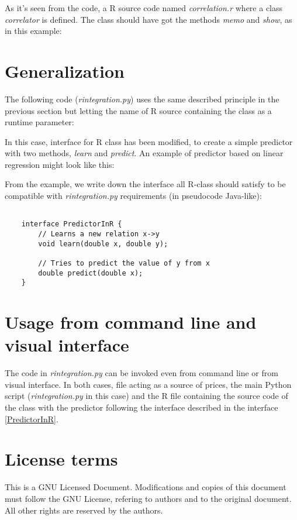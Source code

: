 \documentclass[11pt,a4paper]{article}
\begin{document}
\lstset{language=Python,frame=single,tabsize=2,basicstyle=\tiny}


As it's seen from the code, a R source code named \emph{correlation.r}
where a class \emph{correlator} is defined. The class should have got the
methods \emph{memo} and \emph{show}, as in this example:

\lstset{language=R,frame=single,tabsize=2,basicstyle=\tiny}




\section{Generalization}

The following code (\emph{rintegration.py}) uses the same described principle 
in the previous section but letting the name of R source containing the 
class as a runtime parameter:

\lstset{language=Python,frame=single,tabsize=2,basicstyle=\tiny}


In this case, interface for R class has been modified, to create a simple
predictor with two methods, \emph{learn} and \emph{predict}. An example of
predictor based on linear regression might look like this:

From the example, we write down the interface all R-class should satisfy
to be compatible with \emph{rintegration.py} requirements (in pseudocode 
Java-like):

\lstset{language=Java,frame=single,tabsize=4,basicstyle=\tiny}
\begin{lstlisting}

    interface PredictorInR {
        // Learns a new relation x->y
        void learn(double x, double y);

        // Tries to predict the value of y from x
        double predict(double x);
    }

\end{lstlisting}
\label{PredictorInR}



\section{Usage from command line and visual interface}

The code in \emph{rintegration.py} can be invoked even from command line or
from visual interface. In both cases, file acting as a source of prices,
the main Python script (\emph{rintegration.py} in this case) and the R file
containing the source code of the class with the predictor following the 
interface described in the interface \ref{PredictorInR}.


\section{License terms}

This is a GNU Licensed Document. Modifications and copies of this document
must follow the GNU License, refering to authors and to the original document.
All other rights are reserved by the authors.
\end{document}

